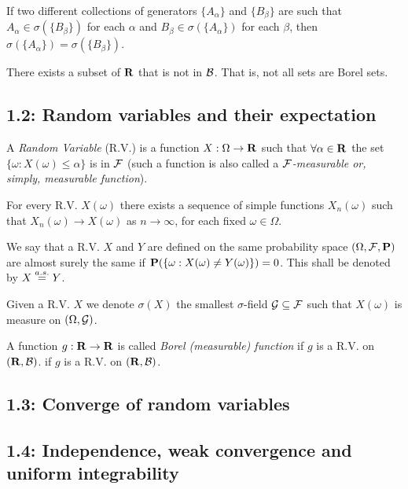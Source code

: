 \begin{lemma*} 
If two different collections of generators $\{A_\alpha\}$ and $\{B_\beta\}$ are
such that $A_\alpha \in \sigma(\{B_\beta\})$ for each $\alpha$ and $B_\beta \in
\sigma(\{A_\alpha\})$ for each $\beta$, then $\sigma(\{A_\alpha\}) =
\sigma(\{B_\beta\})$.
\end{lemma*} 

\begin{proposition*} 
There exists a subset of $\mathbf{R}$ that is not in $\mathcal{B}$. That is, not all sets are
Borel sets.
\end{proposition*} 


\subsection*{1.2: Random variables and their expectation}
\begin{definition*}
A \emph{Random Variable} (R.V.) is a function $X: \Omega \rightarrow \mathbf{R}$ such
that $\forall \alpha \in \mathbf{R}$ the set $\{\omega: X(\omega) \le \alpha\}$ is in
$\mathcal{F}$ (such a function is also called a \emph{$\mathcal{F}$-measurable or, simply,
measurable function}).
\end{definition*} 

\begin{proposition*} 
For every R.V. $X(\omega)$ there exists a sequence of simple functions
$X_n(\omega)$ such that $X_n(\omega) \rightarrow X(\omega)$ as $n\rightarrow
\infty$, for each fixed $\omega \in \Omega$.
\end{proposition*} 

\begin{definition*}
We say that a R.V. $X$ and $Y$ are defined on the same probability space
$(\Omega, \mathcal{F}, \mathbf{P})$ are almost surely the same if $\mathbf{P}(\{\omega: X(\omega) \ne
Y(\omega)\}) = 0$. This shall be denoted by $X \stackrel{a.s.}{=} Y$.
\end{definition*} 

\begin{definition*}
Given a R.V. $X$ we denote $\sigma(X)$ the smallest $\sigma$-field $\mathcal{G} \subseteq
\mathcal{F}$ such that $X(\omega)$ is measure on $(\Omega, \mathcal{G})$.
\end{definition*} 

\begin{definition*} 
A function $g: \mathbf{R} \rightarrow \mathbf{R}$ is called \emph{Borel (measurable) function}
if $g$ is a R.V. on $(\mathbf{R}, \mathcal{B})$. if $g$ is a R.V. on $(\mathbf{R}, \mathcal{B})$.
\end{definition*} 





\subsection*{1.3: Converge of random variables}
\subsection*{1.4: Independence, weak convergence and uniform integrability}

